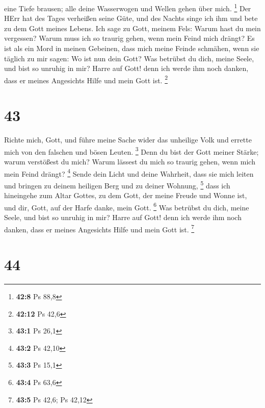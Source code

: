 eine Tiefe brausen; alle deine Wasserwogen und Wellen gehen über mich.
\footnote{\textbf{42:8} Ps 88,8}  Der HErr hat des Tages
verheißen seine Güte, und des Nachts singe ich ihm und bete zu dem Gott
meines Lebens.  Ich sage zu Gott, meinem Fels: Warum hast
du mein vergessen? Warum muss ich so traurig gehen, wenn mein Feind mich
drängt?  Es ist als ein Mord in meinen Gebeinen, dass mich
meine Feinde schmähen, wenn sie täglich zu mir sagen: Wo ist nun dein
Gott?  Was betrübst du dich, meine Seele, und bist so
unruhig in mir? Harre auf Gott! denn ich werde ihm noch danken, dass er
meines Angesichts Hilfe und mein Gott ist. \footnote{\textbf{42:12} Ps
  42,6}

\hypertarget{section-18}{%
\section{43}\label{section-18}}

 Richte mich, Gott, und führe meine Sache wider das
unheilige Volk und errette mich von den falschen und bösen Leuten.
\footnote{\textbf{43:1} Ps 26,1}  Denn du bist der Gott
meiner Stärke; warum verstößest du mich? Warum lässest du mich so
traurig gehen, wenn mich mein Feind drängt? \footnote{\textbf{43:2} Ps
  42,10}  Sende dein Licht und deine Wahrheit, dass sie mich
leiten und bringen zu deinem heiligen Berg und zu deiner Wohnung,
\footnote{\textbf{43:3} Ps 15,1}  dass ich hineingehe zum
Altar Gottes, zu dem Gott, der meine Freude und Wonne ist, und dir,
Gott, auf der Harfe danke, mein Gott. \footnote{\textbf{43:4} Ps 63,6}
 Was betrübst du dich, meine Seele, und bist so unruhig in
mir? Harre auf Gott! denn ich werde ihm noch danken, dass er meines
Angesichts Hilfe und mein Gott ist. \footnote{\textbf{43:5} Ps 42,6; Ps
  42,12}

\hypertarget{section-19}{%
\section{44}\label{section-19}}

